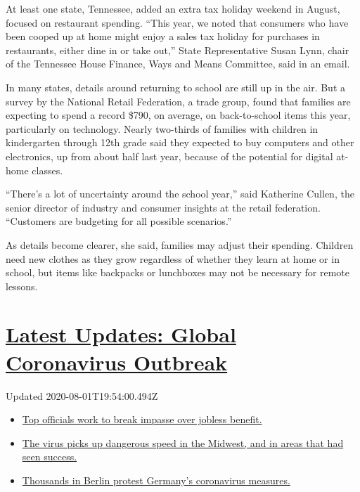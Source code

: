 At least one state, Tennessee, added an extra tax holiday weekend in
August, focused on restaurant spending. ``This year, we noted that
consumers who have been cooped up at home might enjoy a sales tax
holiday for purchases in restaurants, either dine in or take out,''
State Representative Susan Lynn, chair of the Tennessee House Finance,
Ways and Means Committee, said in an email.

In many states, details around returning to school are still up in the
air. But a survey by the National Retail Federation, a trade group,
found that families are expecting to spend a record \$790, on average,
on back-to-school items this year, particularly on technology. Nearly
two-thirds of families with children in kindergarten through 12th grade
said they expected to buy computers and other electronics, up from about
half last year, because of the potential for digital at-home classes.

``There's a lot of uncertainty around the school year,'' said Katherine
Cullen, the senior director of industry and consumer insights at the
retail federation. ``Customers are budgeting for all possible
scenarios.''

As details become clearer, she said, families may adjust their spending.
Children need new clothes as they grow regardless of whether they learn
at home or in school, but items like backpacks or lunchboxes may not be
necessary for remote lessons.

\hypertarget{latest-updates-global-coronavirus-outbreak}{%
\section{\texorpdfstring{\href{https://www.nytimes3xbfgragh.onion/2020/08/01/world/coronavirus-covid-19.html?action=click\&pgtype=Article\&state=default\&region=MAIN_CONTENT_1\&context=storylines_live_updates}{Latest
Updates: Global Coronavirus
Outbreak}}{Latest Updates: Global Coronavirus Outbreak}}\label{latest-updates-global-coronavirus-outbreak}}

Updated 2020-08-01T19:54:00.494Z

\begin{itemize}
\tightlist
\item
  \href{https://www.nytimes3xbfgragh.onion/2020/08/01/world/coronavirus-covid-19.html?action=click\&pgtype=Article\&state=default\&region=MAIN_CONTENT_1\&context=storylines_live_updates\#link-3ac56579}{Top
  officials work to break impasse over jobless benefit.}
\item
  \href{https://www.nytimes3xbfgragh.onion/2020/08/01/world/coronavirus-covid-19.html?action=click\&pgtype=Article\&state=default\&region=MAIN_CONTENT_1\&context=storylines_live_updates\#link-8796723}{The
  virus picks up dangerous speed in the Midwest, and in areas that had
  seen success.}
\item
  \href{https://www.nytimes3xbfgragh.onion/2020/08/01/world/coronavirus-covid-19.html?action=click\&pgtype=Article\&state=default\&region=MAIN_CONTENT_1\&context=storylines_live_updates\#link-25930521}{Thousands
  in Berlin protest Germany's coronavirus measures.}
\end{itemize}


